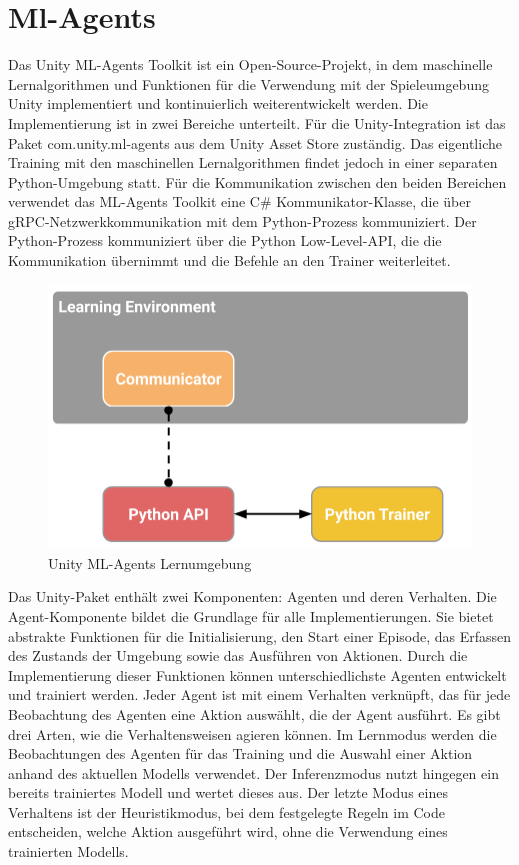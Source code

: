 {\chapter{Ml-Agents}}
\label{sec:mlagents}
Das Unity ML-Agents Toolkit ist ein Open-Source-Projekt, in dem maschinelle Lernalgorithmen und Funktionen für die Verwendung mit der Spieleumgebung Unity implementiert und kontinuierlich weiterentwickelt werden. Die Implementierung ist in zwei Bereiche unterteilt. Für die Unity-Integration ist das Paket com.unity.ml-agents aus dem Unity Asset Store zuständig. Das eigentliche Training mit den maschinellen Lernalgorithmen findet jedoch in einer separaten Python-Umgebung statt. Für die Kommunikation zwischen den beiden Bereichen verwendet das ML-Agents Toolkit eine C\# Kommunikator-Klasse, die über gRPC-Netzwerkkommunikation mit dem Python-Prozess kommuniziert. Der Python-Prozess kommuniziert über die Python Low-Level-API, die die Kommunikation übernimmt und die Befehle an den Trainer weiterleitet.\cite{unity_mlagents_toolkit_overview}

\begin{figure}[H]
  \centering  
  \includegraphics[scale=0.4]{img/learning_environment_basic.png}
  \caption{Unity ML-Agents Lernumgebung \protect\cite{unity_mlagents_learning_environment_basic}}
  \label{fig:learning_environment_basic}
\end{figure}

Das Unity-Paket enthält zwei Komponenten: Agenten und deren Verhalten. Die Agent-Komponente bildet die Grundlage für alle Implementierungen. Sie bietet abstrakte Funktionen für die Initialisierung, den Start einer Episode, das Erfassen des Zustands der Umgebung sowie das Ausführen von Aktionen. Durch die Implementierung dieser Funktionen können unterschiedlichste Agenten entwickelt und trainiert werden. Jeder Agent ist mit einem Verhalten verknüpft, das für jede Beobachtung des Agenten eine Aktion auswählt, die der Agent ausführt. Es gibt drei Arten, wie die Verhaltensweisen agieren können. Im Lernmodus werden die Beobachtungen des Agenten für das Training und die Auswahl einer Aktion anhand des aktuellen Modells verwendet. Der Inferenzmodus nutzt hingegen ein bereits trainiertes Modell und wertet dieses aus. Der letzte Modus eines Verhaltens ist der Heuristikmodus, bei dem festgelegte Regeln im Code entscheiden, welche Aktion ausgeführt wird, ohne die Verwendung eines trainierten Modells.\cite{unity_mlagents_toolkit_overview}

